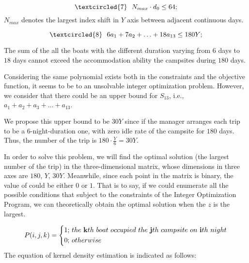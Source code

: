 \documentclass[a4paper, 12pt]{article}
\begin{document}
\begin{equation}
\textcircled{\scriptsize 7}~~N_{max}\cdot d_0\leq64;
\end{equation}
$N_{max}$ denotes the largest index shift in $Y$ axis between adjacent continuous days.

\begin{equation}
\textcircled{\scriptsize 8}~~6a_1+7a_2+\ldots+18a_{13}\leq180Y;
\end{equation}

The sum of the all the boats with the different duration varying from $6$ days to $18$ days cannot exceed the accommodation ability the campsites during $180$ days.

Considering the same polynomial exists both in the constraints and the objective function, it seems to be to an unsolvable integer optimization problem. However, we consider that there could be an upper bound for $S_{13}$, i.e., $a_1+a_2+a_3+\ldots+a_{13}$.

We propose this upper bound to be $30Y$ since if the manager arranges each trip to be a 6-night-duration one, with zero idle rate of the campsite for $180$ days. Thus, the number of the trip is $180\cdot     {\frac{Y}{6}}=30Y$.

In order to solve this problem, we will find the optimal solution (the largest number of the trip) in the three-dimensional matrix, whose dimensions in three axes are $180$, $Y$, $30Y$. Meanwhile, since each point in the matrix is binary, the value of  could be either $0$ or $1$. That is to say, if we could enumerate all the possible conditions that subject to the constraints of the Integer Optimization Program, we can theoretically obtain the optimal solution when the $z$ is the largest.

\begin{equation}
P(i,j,k)=\left\{\begin{aligned}
1;&~the~{\bf{k}}th~boat~occupied~the~{\bf{j}}th~campsite~on~{\bf{i}}th~night \\
0;&~otherwise
\end{aligned}\right.
\end{equation}
%
%
%
%
%
The equation of kernel density estimation is indicated as follows:
\end{document}
